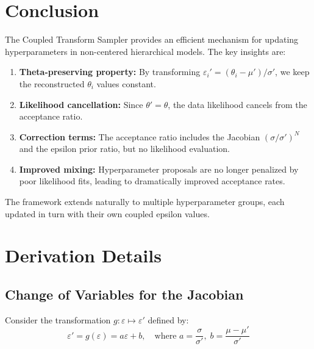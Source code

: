 \documentclass[11pt,a4paper]{article}
\theoremstyle{definition}
\newcommand{\eps}{\varepsilon}
\begin{document}
\section{Conclusion}
\label{sec:conclusion}

The Coupled Transform Sampler provides an efficient mechanism for updating
hyperparameters in non-centered hierarchical models. The key insights are:

\begin{enumerate}
    \item \textbf{Theta-preserving property:} By transforming $\eps_i' = (\theta_i - \mu')/\sigma'$,
    we keep the reconstructed $\theta_i$ values constant.

    \item \textbf{Likelihood cancellation:} Since $\theta' = \theta$, the data likelihood
    cancels from the acceptance ratio.

    \item \textbf{Correction terms:} The acceptance ratio includes the Jacobian
    $(\sigma/\sigma')^N$ and the epsilon prior ratio, but no likelihood evaluation.

    \item \textbf{Improved mixing:} Hyperparameter proposals are no longer penalized
    by poor likelihood fits, leading to dramatically improved acceptance rates.
\end{enumerate}

The framework extends naturally to multiple hyperparameter groups, each updated
in turn with their own coupled epsilon values.

\appendix
\section{Derivation Details}
\label{sec:appendix}

\subsection{Change of Variables for the Jacobian}

Consider the transformation $g: \eps \mapsto \eps'$ defined by:
\begin{equation}
    \eps' = g(\eps) = a\eps + b, \quad \text{where } a = \frac{\sigma}{\sigma'}, \; b = \frac{\mu - \mu'}{\sigma'}
\end{equation}
\end{document}
